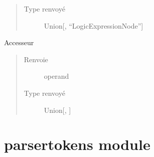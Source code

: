 \documentclass[letterpaper,10pt,french]{sphinxmanual}
\begin{document}
\begin{fulllineitems}
\begin{fulllineitems}
\begin{quote}
\begin{description}
\item[{Type renvoyé}] \leavevmode
Union{[}{\hyperref[\detokenize{comparaisonexpressionnodes:comparaisonexpressionnodes.ComparaisonExpressionNode}]{}}, “LogicExpressionNode”{]}

\end{description}\end{quote}

\end{fulllineitems}


\begin{fulllineitems}
\label{\detokenize{logicexpressionnodes:logicexpressionnodes.OrNode.operands}}
Accesseur
\begin{quote}\begin{description}
\item[{Renvoie}] \leavevmode
operand

\item[{Type renvoyé}] \leavevmode
Union{[}{\hyperref[\detokenize{logicexpressionnodes:logicexpressionnodes.LogicExpressionNode}]{}}, {\hyperref[\detokenize{comparaisonexpressionnodes:comparaisonexpressionnodes.ComparaisonExpressionNode}]{}}{]}

\end{description}\end{quote}

\end{fulllineitems}


\end{fulllineitems}



\section{parsertokens module}
\label{\detokenize{parsertokens:module-parsertokens}}\label{\detokenize{parsertokens:parsertokens-module}}\label{\detokenize{parsertokens::doc}}\label{\detokenize{parsertokens:module-parsertokens}}
\end{document}
